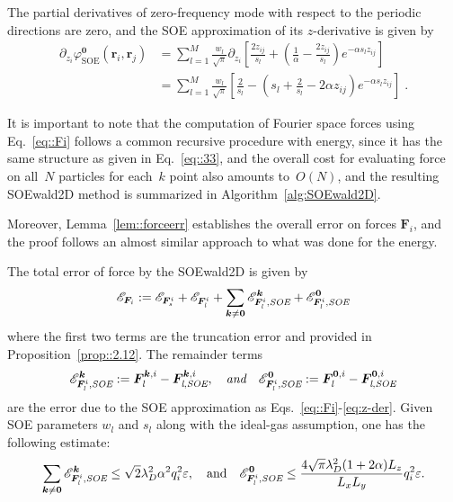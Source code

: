 The partial derivatives of zero-frequency mode with respect to the periodic directions are zero, and the SOE approximation of its $z$-derivative is given by
\begin{equation}\label{eq:dzphi_0}
	\begin{split}
		\partial_{z_{i}} \varphi^{\bm{0}}_{\text{SOE}}(\bm{r}_{i},\bm{r}_{j}) 
		& = \sum_{l=1}^{M} \frac{w_l}{\sqrt{\pi}} \partial_{z_{i}} \left[\frac{2z_{ij}}{s_l}+\left(\frac{1}{\alpha} - \frac{2z_{ij}}{s_l}\right)e^{-\alpha s_l z_{ij}}\right] \\
		& = \sum_{l=1}^{M} \frac{w_l}{\sqrt{\pi}} \left[ \frac{2}{s_l} - \left( s_l + \frac{2}{s_l} - 2 \alpha z_{ij} \right) e^{-\alpha s_l z_{ij}} \right]\;.
	\end{split}
\end{equation}

It is important to note that the computation of Fourier space forces using Eq.~\eqref{eq::Fi} follows a common recursive procedure with energy, since it has the same structure as given in Eq.~\eqref{eq::33}, and the overall cost for evaluating force on all~$N$ particles for each~$k$ point also amounts to~$O(N)$, and the resulting SOEwald2D method is summarized in Algorithm~\ref{alg:SOEwald2D}.

Moreover, Lemma~\ref{lem::forceerr} establishes the overall error on forces $\bm{F}_{i}$, and the proof follows an almost similar approach to what was done for the energy. %

\begin{lem}\label{lem::forceerr}
	The total error of force by the SOEwald2D is given by
	\begin{equation}
		\mathscr{E}_{\bm{F}_{i}} := \mathscr{E}_{\bm{F}_{\emph{s}}^{i}} + \mathscr{E}_{\bm{F}_{\emph{l}}^{i}} + \sum_{\bm{k}\neq \bm{0}} \mathscr{E}_{\bm{F}_{\emph{l}}^i, \emph{SOE}}^{\bm{k}} + \mathscr{E}_{\bm{F}_{\emph{l}}^{i},\emph{SOE}}^{\bm{0}}
	\end{equation}
	where the first two terms are the truncation error and provided in Proposition~\ref{prop::2.12}. The remainder terms 
	\begin{equation}
		\mathscr{E}_{\bm{F}_{\emph{l}}^i,\emph{SOE}}^{\bm{k}} := \bm{F}_{\emph{l}}^{\bm{k}, i} - \bm{F}_{\emph{l},\emph{SOE}}^{\bm{k}, i}, \quad\emph{and} \quad \mathscr{E}_{\bm{F}_{\emph{l}}^{i}, \emph{SOE}}^{\bm{0}} := \bm{F}_{\emph{l}}^{\bm{0}, i}-\bm{F}_{\emph{l}, \emph{SOE}}^{\bm{0}, i}
	\end{equation}
	are the error due to the SOE approximation as Eqs.~\eqref{eq::Fi}-\eqref{eq:z-der}. Given SOE parameters $w_l$ and $s_l$ along with the ideal-gas assumption, one has the following estimate:
	\begin{equation}
		\sum_{\bm{k}\neq\bm{0}} \mathscr{E}_{\bm{F}_{\emph{l}}^i, \emph{SOE}}^{ \bm{k}}\leq \sqrt{2}\lambda_D^2\alpha^2q_{i}^2\varepsilon,\quad\text{and}\quad \mathscr{E}_{\bm{F}_{\emph{l}}^{i},\emph{SOE}}^{\bm{0}}\leq \frac{4\sqrt{\pi}\lambda_D^2 (1+2\alpha)L_z}{L_xL_y}q_{i}^2\varepsilon.
	\end{equation}
\end{lem}



